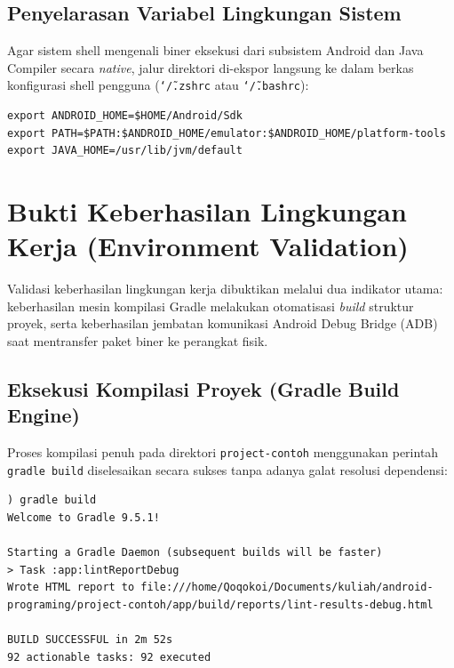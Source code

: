 \documentclass[12pt,a4paper]{article}
\begin{document}
\subsection{Penyelarasan Variabel Lingkungan Sistem}
Agar sistem shell mengenali biner eksekusi dari subsistem Android dan Java Compiler secara \textit{native}, jalur direktori di-ekspor langsung ke dalam berkas konfigurasi shell pengguna (\texttt{\char`\~/.zshrc} atau \texttt{\char`\~/.bashrc}):

\begin{lstlisting}[style=terminal, title={Konfigurasi Ekspor Variabel pada \char`\~/.zshrc}]
export ANDROID_HOME=$HOME/Android/Sdk
export PATH=$PATH:$ANDROID_HOME/emulator:$ANDROID_HOME/platform-tools
export JAVA_HOME=/usr/lib/jvm/default
\end{lstlisting}

\newpage

\section{Bukti Keberhasilan Lingkungan Kerja (Environment Validation)}
Validasi keberhasilan lingkungan kerja dibuktikan melalui dua indikator utama: keberhasilan mesin kompilasi Gradle melakukan otomatisasi \textit{build} struktur proyek, serta keberhasilan jembatan komunikasi Android Debug Bridge (ADB) saat mentransfer paket biner ke perangkat fisik.

\subsection{Eksekusi Kompilasi Proyek (Gradle Build Engine)}
Proses kompilasi penuh pada direktori \texttt{project-contoh} menggunakan perintah \texttt{gradle build} diselesaikan secara sukses tanpa adanya galat resolusi dependensi:

\begin{lstlisting}[style=terminal, title={Log Output Konsol Kompilasi Proyek (Screenshot\_20260614\_143036.jpg)}]
) gradle build
Welcome to Gradle 9.5.1!

Starting a Gradle Daemon (subsequent builds will be faster)
> Task :app:lintReportDebug
Wrote HTML report to file:///home/Qoqokoi/Documents/kuliah/android-programing/project-contoh/app/build/reports/lint-results-debug.html

BUILD SUCCESSFUL in 2m 52s
92 actionable tasks: 92 executed
\end{lstlisting}
\end{document}
